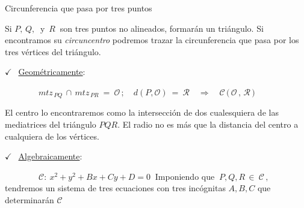 \begin{myalertblock}{Circunferencia que pasa por tres puntos}

\vspace{1mm} Si $P,\, Q,\ \text{ y } \, R	\ $ son tres puntos no alineados, formarán un triángulo. Si encontramos su \emph{circuncentro} podremos trazar la circunferencia que pasa por los tres vértices del triángulo.

\vspace{4mm} $\checkmark \ \ $ \underline{Geométricamente}:

\vspace{2mm} $\qquad \qquad mtz_{\, PQ} \, \cap \, mtz_{\, PR} \ = \ \mathcal O\, ; \quad d(P,\mathcal O) \ = \ \mathcal R \quad \Rightarrow \quad \mathcal C \, \Big(\, \mathcal O \, , \,  \mathcal R\, \Big)$

\vspace{2mm} El centro lo encontraremos como la intersección de dos cualesquiera de las mediatrices del triángulo $PQR$. El radio no es más que la distancia del centro a cualquiera de los vértices.

\vspace{4mm} $\checkmark \ \ $ \underline{Algebraicamente}:

\vspace{2mm} $\qquad \qquad \mathcal C:\ x^2+y^2+Bx+Cy+D=0\ $ Imponiendo que $\ P,Q,R\, \in \ \mathcal C\, ,  $ tendremos un sistema de tres ecuaciones con tres incógnitas $A,B,C$ que determinarán $\mathcal C$

\vspace{1mm}

\end{myalertblock}

\vspace{5mm}

